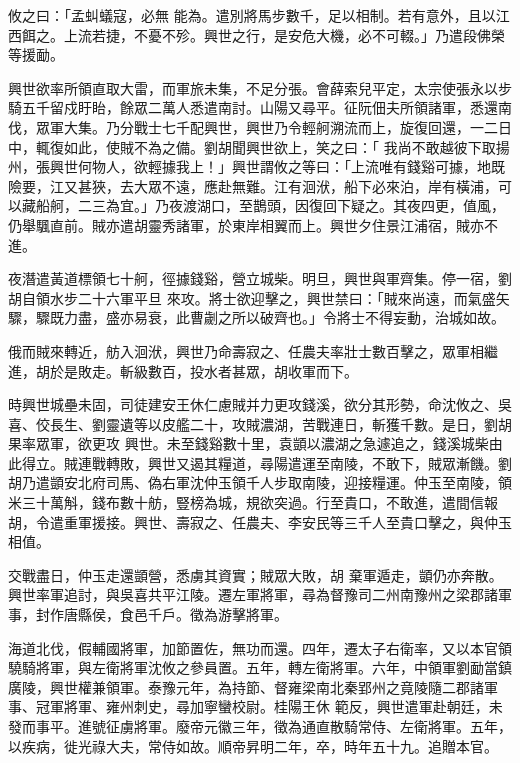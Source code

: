 \begin{pinyinscope}
 攸之曰：「孟虯蟻寇，必無
 能為。遣別將馬步數千，足以相制。若有意外，且以江西餌之。上流若捷，不憂不殄。興世之行，是安危大機，必不可輟。」乃遣段佛榮等援勔。



 興世欲率所領直取大雷，而軍旅未集，不足分張。會薛索兒平定，太宗使張永以步騎五千留戍盱眙，餘眾二萬人悉遣南討。山陽又尋平。征阮佃夫所領諸軍，悉還南伐，眾軍大集。乃分戰士七千配興世，興世乃令輕舸溯流而上，旋復回還，一二日中，輒復如此，使賊不為之備。劉胡聞興世欲上，笑之曰：「
 我尚不敢越彼下取揚州，張興世何物人，欲輕據我上！」興世謂攸之等曰：「上流唯有錢谿可據，地既險要，江又甚狹，去大眾不遠，應赴無難。江有洄洑，船下必來泊，岸有橫浦，可以藏船舸，二三為宜。」乃夜渡湖口，至鵲頭，因復回下疑之。其夜四更，值風，仍舉颿直前。賊亦遣胡靈秀諸軍，於東岸相翼而上。興世夕住景江浦宿，賊亦不進。



 夜潛遣黃道標領七十舸，徑據錢谿，營立城柴。明旦，興世與軍齊集。停一宿，劉胡自領水步二十六軍平旦
 來攻。將士欲迎擊之，興世禁曰：「賊來尚遠，而氣盛矢驟，驟既力盡，盛亦易衰，此曹劌之所以破齊也。」令將士不得妄動，治城如故。



 俄而賊來轉近，舫入洄洑，興世乃命壽寂之、任農夫率壯士數百擊之，眾軍相繼進，胡於是敗走。斬級數百，投水者甚眾，胡收軍而下。



 時興世城壘未固，司徒建安王休仁慮賊并力更攻錢溪，欲分其形勢，命沈攸之、吳喜、佼長生、劉靈遺等以皮艦二十，攻賊濃湖，苦戰連日，斬獲千數。是日，劉胡果率眾軍，欲更攻
 興世。未至錢谿數十里，袁顗以濃湖之急遽追之，錢溪城柴由此得立。賊連戰轉敗，興世又遏其糧道，尋陽遣運至南陵，不敢下，賊眾漸饑。劉胡乃遣顗安北府司馬、偽右軍沈仲玉領千人步取南陵，迎接糧運。仲玉至南陵，領米三十萬斛，錢布數十舫，豎榜為城，規欲突過。行至貴口，不敢進，遣間信報胡，令遣重軍援接。興世、壽寂之、任農夫、李安民等三千人至貴口擊之，與仲玉相值。



 交戰盡日，仲玉走還顗營，悉虜其資實；賊眾大敗，胡
 棄軍遁走，顗仍亦奔散。興世率軍追討，與吳喜共平江陵。遷左軍將軍，尋為督豫司二州南豫州之梁郡諸軍事，封作唐縣侯，食邑千戶。徵為游擊將軍。



 海道北伐，假輔國將軍，加節置佐，無功而還。四年，遷太子右衛率，又以本官領驍騎將軍，與左衛將軍沈攸之參員置。五年，轉左衛將軍。六年，中領軍劉勔當鎮廣陵，興世權兼領軍。泰豫元年，為持節、督雍梁南北秦郢州之竟陵隨二郡諸軍事、冠軍將軍、雍州刺史，尋加寧蠻校尉。桂陽王休
 範反，興世遣軍赴朝廷，未發而事平。進號征虜將軍。廢帝元徽三年，徵為通直散騎常侍、左衛將軍。五年，以疾病，徙光祿大夫，常侍如故。順帝昇明二年，卒，時年五十九。追贈本官。




\end{pinyinscope}
